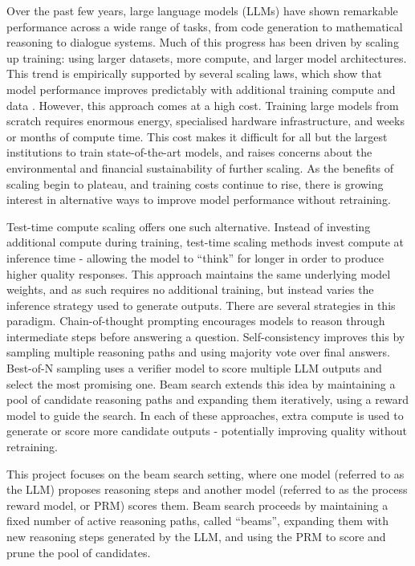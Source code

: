 \documentclass[12pt,twoside]{report}
\begin{document}
Over the past few years, large language models (LLMs) have shown remarkable performance across a wide range of tasks, from code generation to mathematical reasoning to dialogue systems.
Much of this progress has been driven by scaling up training: using larger datasets, more compute, and larger model architectures.
This trend is empirically supported by several scaling laws, which show that model performance improves predictably with additional training compute and data \cite{kaplan2020scaling}.
However, this approach comes at a high cost.
Training large models from scratch requires enormous energy, specialised hardware infrastructure, and weeks or months of compute time.
This cost makes it difficult for all but the largest institutions to train state-of-the-art models, and raises concerns about the environmental and financial sustainability of further scaling.
As the benefits of scaling begin to plateau, and training costs continue to rise, there is growing interest in alternative ways to improve model performance without retraining.

Test-time compute scaling offers one such alternative.
Instead of investing additional compute during training, test-time scaling methods invest compute at inference time - allowing the model to ``think'' for longer in order to produce higher quality responses.
This approach maintains the same underlying model weights, and as such requires no additional training, but instead varies the inference strategy used to generate outputs.
There are several strategies in this paradigm.
Chain-of-thought prompting encourages models to reason through intermediate steps before answering a question.
Self-consistency improves this by sampling multiple reasoning paths and using majority vote over final answers.
Best-of-N sampling uses a verifier model to score multiple LLM outputs and select the most promising one.
Beam search extends this idea by maintaining a pool of candidate reasoning paths and expanding them iteratively, using a reward model to guide the search.
In each of these approaches, extra compute is used to generate or score more candidate outputs - potentially improving quality without retraining.

This project focuses on the beam search setting, where one model (referred to as the LLM) proposes reasoning steps and another model (referred to as the process reward model, or PRM) scores them.
Beam search proceeds by maintaining a fixed number of active reasoning paths, called ``beams'', expanding them with new reasoning steps generated by the LLM, and using the PRM to score and prune the pool of candidates.
\end{document}

